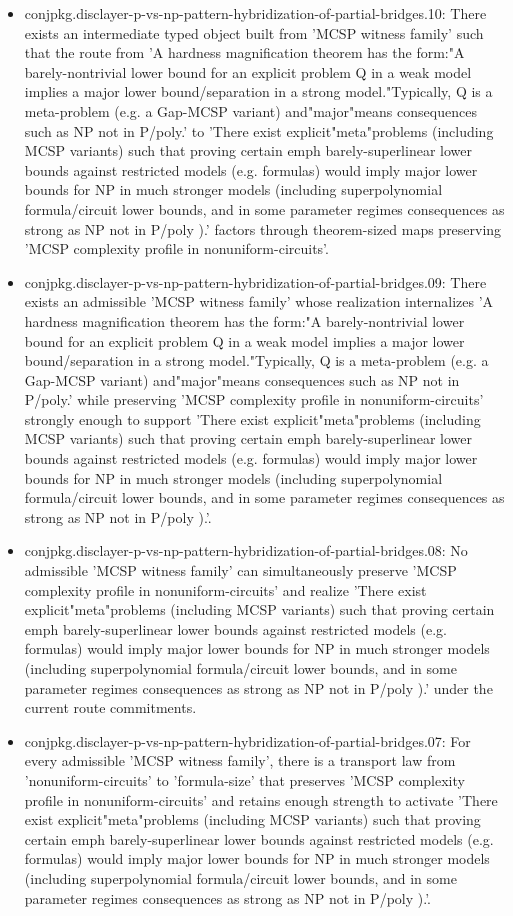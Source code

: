 \documentclass[11pt]{article}
\begin{document}
\begin{itemize}
\item conjpkg.disclayer-p-vs-np-pattern-hybridization-of-partial-bridges.10: There exists an intermediate typed object built from 'MCSP witness family' such that the route from 'A hardness magnification theorem has the form:"A barely-nontrivial lower bound for an explicit problem Q in a weak model implies a major lower bound/separation in a strong model."Typically, Q is a meta-problem (e.g. a Gap-MCSP variant) and"major"means consequences such as NP not in P/poly.' to 'There exist explicit"meta"problems (including MCSP variants) such that proving certain emph barely-superlinear lower bounds against restricted models (e.g. formulas) would imply major lower bounds for NP in much stronger models (including superpolynomial formula/circuit lower bounds, and in some parameter regimes consequences as strong as NP not in P/poly ).' factors through theorem-sized maps preserving 'MCSP complexity profile in nonuniform-circuits'.
\item conjpkg.disclayer-p-vs-np-pattern-hybridization-of-partial-bridges.09: There exists an admissible 'MCSP witness family' whose realization internalizes 'A hardness magnification theorem has the form:"A barely-nontrivial lower bound for an explicit problem Q in a weak model implies a major lower bound/separation in a strong model."Typically, Q is a meta-problem (e.g. a Gap-MCSP variant) and"major"means consequences such as NP not in P/poly.' while preserving 'MCSP complexity profile in nonuniform-circuits' strongly enough to support 'There exist explicit"meta"problems (including MCSP variants) such that proving certain emph barely-superlinear lower bounds against restricted models (e.g. formulas) would imply major lower bounds for NP in much stronger models (including superpolynomial formula/circuit lower bounds, and in some parameter regimes consequences as strong as NP not in P/poly ).'.
\item conjpkg.disclayer-p-vs-np-pattern-hybridization-of-partial-bridges.08: No admissible 'MCSP witness family' can simultaneously preserve 'MCSP complexity profile in nonuniform-circuits' and realize 'There exist explicit"meta"problems (including MCSP variants) such that proving certain emph barely-superlinear lower bounds against restricted models (e.g. formulas) would imply major lower bounds for NP in much stronger models (including superpolynomial formula/circuit lower bounds, and in some parameter regimes consequences as strong as NP not in P/poly ).' under the current route commitments.
\item conjpkg.disclayer-p-vs-np-pattern-hybridization-of-partial-bridges.07: For every admissible 'MCSP witness family', there is a transport law from 'nonuniform-circuits' to 'formula-size' that preserves 'MCSP complexity profile in nonuniform-circuits' and retains enough strength to activate 'There exist explicit"meta"problems (including MCSP variants) such that proving certain emph barely-superlinear lower bounds against restricted models (e.g. formulas) would imply major lower bounds for NP in much stronger models (including superpolynomial formula/circuit lower bounds, and in some parameter regimes consequences as strong as NP not in P/poly ).'.

\end{itemize}
\end{document}
